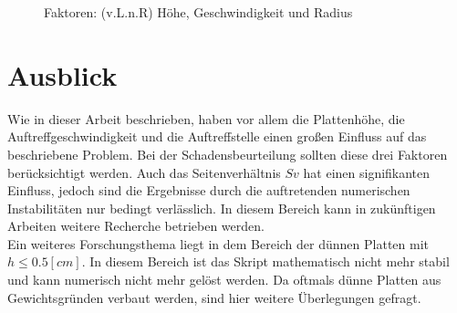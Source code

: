 \begin{figure}[H]%
	\centering
	\qquad
	\caption{Faktoren: (v.L.n.R) Höhe, Geschwindigkeit und Radius}%
	\label{fig:Faktoren}%
\end{figure}



\section{Ausblick}
\label{sec:Ausblick}

Wie in dieser Arbeit beschrieben, haben vor allem die Plattenhöhe, die Auftreffgeschwindigkeit und die Auftreffstelle einen großen Einfluss auf das beschriebene Problem. Bei der Schadensbeurteilung sollten diese drei Faktoren berücksichtigt werden. Auch das Seitenverhältnis $Sv$ hat einen signifikanten Einfluss, jedoch sind die Ergebnisse durch die auftretenden numerischen Instabilitäten nur bedingt verlässlich. In diesem Bereich kann in zukünftigen Arbeiten weitere Recherche betrieben werden. \\
Ein weiteres Forschungsthema liegt in dem Bereich der dünnen Platten mit $h \leq 0.5 [cm]$. In diesem Bereich ist das Skript mathematisch nicht mehr stabil und kann numerisch nicht mehr gelöst werden. Da oftmals dünne Platten aus Gewichtsgründen verbaut werden, sind hier weitere Überlegungen gefragt. \\


